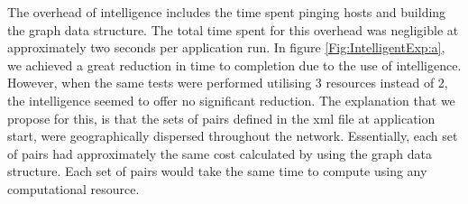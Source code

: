 \documentclass{rspublic}
\newcommand{\micnote}[1]{ {\textcolor{blue} { ***Michael: #1 }}}
\newcommand{\betynote}[1]{ {\textcolor{orange} { ***Bety: #1 }}}
\newcommand{\jhanote}[1]{} \newcommand{\micnote}[1]{}\newcommand{\betynote}[1]{} \newcommand{\fixme}[1]{}
\begin{document}
The overhead of intelligence includes the time spent pinging hosts and
building the graph data structure. The total time spent for this
overhead was negligible at approximately two seconds per application
run. In figure \ref{Fig:IntelligentExp:a}, we achieved a great reduction in
time to completion due to the use of intelligence.  However, when the
same tests were performed utilising 3 resources instead of 2, the
intelligence seemed to offer no significant reduction. The explanation
that we propose for this, is that the sets of pairs defined in
the xml file at application start, were geographically dispersed
throughout the network.  Essentially, each set of pairs had
approximately the same cost calculated by using the graph data
structure. Each set of pairs would take the same time to compute using
any computational resource.  \jhanote{Perhaps define a test to verify
this, so a note can go in saying we investigated this}
\end{document}
